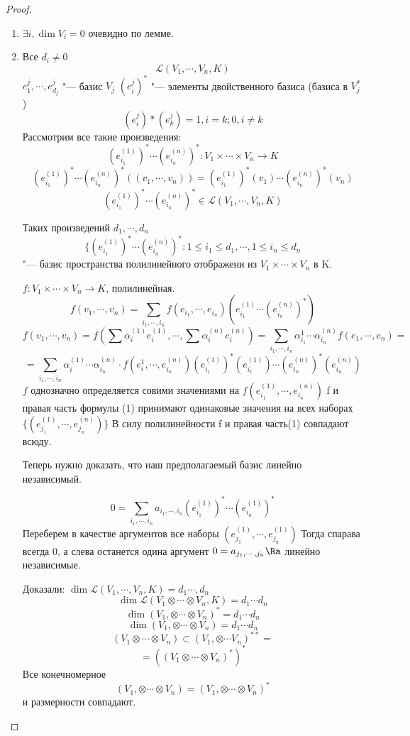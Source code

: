 \begin{proof}
    \begin{enumerate}
    \item $\exists i, \dim V_i = 0$ очевидно по лемме.
    \item Все $d_i \ne 0$
    $$\mathcal{L}(V_1, \cdots, V_n, K)$$
    $e_1^{j}, \cdots, e_{d_j}^j$  "--- базис $V_j$
    $(e_i^j)^*$ "--- элементы двойственного базиса (базиса в $V_j^*$)
    $$(e_i^j)*(e_{k}^j) =  1, i = k; 0, i \ne k$$
    Рассмотрим все такие произведения:
    $$(e^{(1)}_{i_1})^* \cdots (e_{i_n}^{(n)})^* \colon V_1 \times \cdots \times V_n \to K$$
    $$(e_{i_1}^{(1)})^* \cdots (e^{(n)}_{i_n})^*((v_1, \cdots, v_n)) = (e_{i_1}^{(1)})^*(v_1) \cdots (e_{i_n}^{(n)})^*(v_n)$$
    $$(e_{i_1}^{(1)})^* \cdots (e_{i_n}^{(n)})^* \in \mathcal{L}(V_1, \cdots, V_n, K)$$

    Таких произведений $d_1, \cdots, d_n$ 
    $$\{ (e_{i_1}^{(1)})^* \cdots (e_{i_n}^{(n)})^* \colon 1 \le i_1 \le d_1, \cdots, 1 \le i_n \le d_n$$ "--- базис
    пространства полилинейного отображени из $V_1 \times \cdots \times V_n$ в K.

    $f \colon V_1 \times \cdots \times V_n \to K$, полилинейная. 
    $$f(v_1, \cdots, v_n) = \sum_{i_1, \cdots, i_n}f(e_{i_1}, \cdots, e_{i_n})(e_{i_1}^{(1)} \cdots (e_{i_n}^{(n)})^{*})$$
    $$f(v_1, \cdots, v_n) = f(\sum \alpha_i^{(1)}e_i^{(1)}, \cdots, \sum\alpha_i^{(n)}e_i^{(n)}) = \sum_{i_1, \cdots, i_n}\alpha_{i_1}^{1} \cdots \alpha_{i_n}^{(n)}f(e_1, \cdots, e_n) = $$
    $$= \sum_{i_1, \cdots, i_n} \alpha_i^{(1)} \cdots \alpha_{i_n}^{(n)} \cdot f(e_{i}^{1}, \cdots, e_{i_n}^{(n)})(e_{i_1}^{(1)})^*(e_{i_1}^{(1)}) \cdots (e_{i_n}^{(n)})^*(e_{i_n}^{(n)})$$
    $f$ однозначно определяется совими значениями на $f(e_{i_1}^{(1)}, \cdots, e_{i_n}^{(n)})$
    f и правая часть формулы (1) принимают одинаковые значения на всех наборах $\{(e_{j_1}^{(1)}, \cdots, e_{j_n}^{(n)})\}$
    В силу полилинейности f и правая часть(1) совпадают всюду.
   
    Теперь нужно доказать, что наш предполагаемый базис линейно независимый. 

    $$0 = \sum_{i_1, \cdots, i_n}a_{i_1, \cdots, i_n}(e_{i_1}^{(1)})^* \cdots (e_{i_n}^{(1)})^*$$
    Переберем в качестве аргументов все наборы $(e_{j_1}^{(1)}, \cdots, e_{j_n}^(1))$
    Тогда спарава всегда 0, а слева останется одина аргумент
    $0 = a_{j_1, \cdots, j_n} \Ra$  линейно независимые. 

    Доказали: $\dim \mathcal{L}(V_1, \cdots, V_n, K) = d_1 \cdots, d_n$
    $$\dim \mathcal{L}(V_1 \otimes \cdots \otimes V_n, K) = d_1 \cdots d_n$$
    $$\dim (V_1, \otimes \cdots \otimes V_n)^* = d_1 \cdots d_n$$
    $$\dim (V_1, \otimes \cdots \otimes V_n) = d_1 \cdots d_n$$
    $$(V_1 \otimes \cdots \otimes V_n) \subset (V_1, \otimes \cdots V_n)^{**} = $$
    $$= ((V_1 \otimes \cdots \otimes V_n)^*)^*$$
    Все конечномерное 
    $$(V_1, \otimes \cdots \otimes V_n) = (V_1, \otimes \cdots \otimes V_n)^*$$
    и размерности совпадают. 
    \end{enumerate}
\end{proof}

